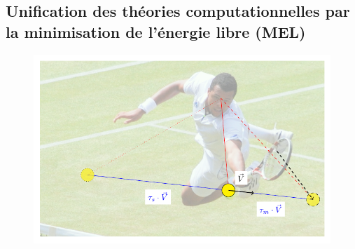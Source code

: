 \documentclass[11pt,french,a4paper,oneside]{article}%
\newcommand{\ms}{\si{\milli\second}}%
\newcommand{\m}{\si{\meter}}%
\newcommand{\s}{\si{\second}}%
\begin{document}
%
\subsection{Unification des théories computationnelles par la minimisation de l'énergie libre (MEL)~\citep{PerrinetAdamsFriston14} }
\label{sec:free}
\begin{figure}%
\begin{center}
   \includegraphics[width=\columnwidth]{figure-tsonga}%
\end{center}%
\caption{%
}
\end{figure}
\end{document}
